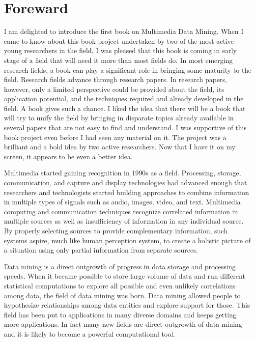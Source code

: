 \chapter*{Foreward}
I am delighted to introduce the first book on Multimedia Data Mining.  When I came to know about this book project undertaken by two of the most active young researchers in the field, I was pleased that this book is coming in early stage of a field that will need it more than most fields do.  In most emerging research fields, a book can play a significant role in bringing some maturity to the field.  Research fields advance through research papers.  In research papers, however, only a limited perspective could be provided about the field, its application potential, and the techniques required and already developed in the field.  A book gives such a chance.  I liked the idea that there will be a book that will try to unify the field by bringing in disparate topics already available in several papers that are not easy to find and understand.  I was supportive of this book project even before I had seen any material on it.  The project was a brilliant and a bold idea by two active researchers.  Now that I have it on my screen, it appears to be even a better idea.  

Multimedia started gaining recognition in 1990s as a field.  Processing, storage, communication, and capture and display technologies had advanced enough that researchers and technologists started building approaches to combine information in multiple types of signals such as audio, images, video, and  text.  Multimedia computing and communication techniques recognize correlated information in multiple sources as well as insufficiency of information in any individual source.    By properly selecting sources to provide complementary information, such systems aspire, much like human perception system, to create a holistic picture of a situation using only partial information from separate sources.

Data mining is a direct outgrowth of progress in data storage and processing speeds.  When it became possible to store large volume of data and run different statistical computations to explore all possible and even unlikely correlations among data, the field of data mining was born.  Data mining allowed people to hypothesize relationships among data entities and explore support for those.  This field has been put to applications in many diverse domains and keeps getting more applications.  In fact many new fields are direct outgrowth of data mining and it is likely to become a powerful computational tool.\vadjust{\vfill\pagebreak}

\thispagestyle{empty}

